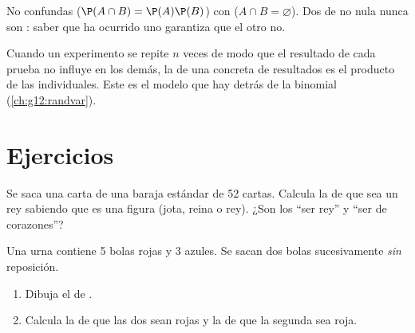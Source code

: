 \begin{remark}
No confundas \emph{} ($\P(A\cap B) = \P(A)\P(B)$) con
\emph{} ($A \cap B = \varnothing$). Dos 
de  no nula nunca son : saber que ha ocurrido uno
garantiza que el otro no.
\end{remark}

\begin{definition}\label{def:g12:condprob:repet}
Cuando un experimento se repite $n$ veces de modo que el resultado de cada
prueba no influye en los demás, la  de una  concreta de
resultados es el producto de las  individuales. Este es el
modelo que hay detrás de la  binomial
(\cref{ch:g12:randvar}).
\end{definition}

\section{Ejercicios}

\begin{exercise}[$\star$]\label{exo:g12:condprob:1}
Se saca una carta de una baraja estándar de 52 cartas. Calcula la
 de que sea un rey sabiendo que es una figura (jota, reina o
rey). ¿Son  los  ``ser rey'' y ``ser de corazones''?
\end{exercise}

\begin{exercise}[$\star$]\label{exo:g12:condprob:2}
Una urna contiene 5 bolas rojas y 3 azules. Se sacan dos bolas
sucesivamente \emph{sin} reposición.
\begin{enumerate}
  \item Dibuja el  de .
  \item Calcula la  de que las dos sean rojas y la 
        de que la segunda sea roja.
\end{enumerate}
\end{exercise}

